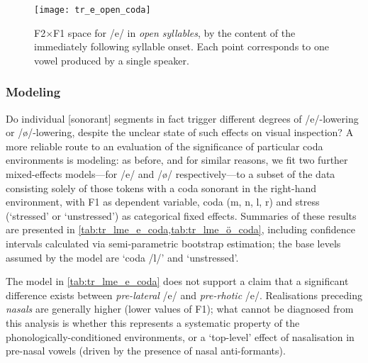 \begin{figure}[ht]
  \centering
  \texttt{[image: tr\_e\_open\_coda]}
  \caption[F2$\times$F1 space for /e/ in open syllables preceding sonorant onsets.]{F2$\times$F1 space for /e/ in \textit{open syllables}, by the content of the immediately following syllable onset. Each point corresponds to one vowel produced by a single speaker.}
  \label{fig:tr_e_open_codas}
\end{figure}

\subsubsection{Modeling}\label{sss:trcodamodel}

Do individual [sonorant] segments in fact trigger different degrees of /e/-lowering or /\o/-lowering, despite the unclear state of such effects on visual inspection? A more reliable route to an evaluation of the significance of particular coda environments is modeling: as before, and for similar reasons, we fit two further mixed-effects models---for /e/ and /\o/ respectively---to a subset of the data consisting solely of those tokens with a coda sonorant in the right-hand environment, with F1 as dependent variable, coda (m, n, l, r) and stress (`stressed' or `unstressed') as categorical fixed effects. Summaries of these results are presented in \cref{tab:tr_lme_e_coda,tab:tr_lme_ö_coda}, including confidence intervals calculated via semi-parametric bootstrap estimation; the base levels assumed by the model are `coda /l/' and `unstressed'.

The model in \cref{tab:tr_lme_e_coda} does not support a claim that a significant difference exists between \emph{pre-lateral} /e/ and \emph{pre-rhotic} /e/. Realisations preceding \emph{nasals} are generally higher (lower values of F1); what cannot be diagnosed from this analysis is whether this represents a systematic property of the phonologically-conditioned environments, or a `top-level' effect of nasalisation in pre-nasal vowels (driven by the presence of nasal anti-formants).

